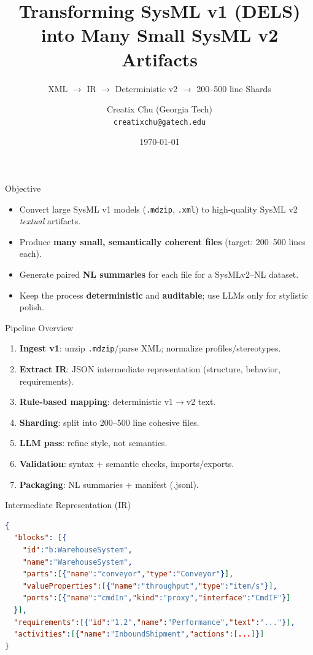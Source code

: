 \documentclass[aspectratio=169]{beamer}
\title{Transforming SysML v1 (DELS) into Many Small SysML v2 Artifacts}
\subtitle{XML $\rightarrow$ IR $\rightarrow$ Deterministic v2 $\rightarrow$ 200--500 line Shards}
\author{Creatix Chu (Georgia Tech) \\ \texttt{creatixchu@gatech.edu}}
\date{\today}
\begin{document}
\begin{frame}
  \titlepage
\end{frame}

\begin{frame}{Objective}
\begin{itemize}
  \item Convert large SysML v1 models (\texttt{.mdzip}, \texttt{.xml}) to high-quality SysML v2 \emph{textual} artifacts.
  \item Produce \textbf{many small, semantically coherent files} (target: 200--500 lines each).
  \item Generate paired \textbf{NL summaries} for each file for a SysMLv2--NL dataset.
  \item Keep the process \textbf{deterministic} and \textbf{auditable}; use LLMs only for stylistic polish.
\end{itemize}
\end{frame}

\begin{frame}{Pipeline Overview}
\begin{enumerate}
  \item \textbf{Ingest v1}: unzip \texttt{.mdzip}/parse XML; normalize profiles/stereotypes.
  \item \textbf{Extract IR}: JSON intermediate representation (structure, behavior, requirements).
  \item \textbf{Rule-based mapping}: deterministic v1$\rightarrow$v2 text.
  \item \textbf{Sharding}: split into 200–500 line cohesive files.
  \item \textbf{LLM pass}: refine style, not semantics.
  \item \textbf{Validation}: syntax + semantic checks, imports/exports.
  \item \textbf{Packaging}: NL summaries + manifest (.jsonl).
\end{enumerate}
\end{frame}

\begin{frame}[fragile]{Intermediate Representation (IR)}
\small
\begin{lstlisting}[style=code,language=json]
{
  "blocks": [{
    "id":"b:WarehouseSystem",
    "name":"WarehouseSystem",
    "parts":[{"name":"conveyor","type":"Conveyor"}],
    "valueProperties":[{"name":"throughput","type":"item/s"}],
    "ports":[{"name":"cmdIn","kind":"proxy","interface":"CmdIF"}]
  }],
  "requirements":[{"id":"1.2","name":"Performance","text":"..."}],
  "activities":[{"name":"InboundShipment","actions":[...]}]
}
\end{lstlisting}
\normalsize
\end{frame}
\end{document}
